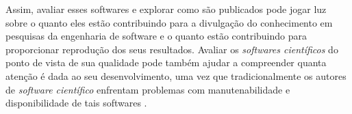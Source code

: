 %
%
%
%
%
%
%
%
%
%
%
%
%
%
%




Assim, avaliar esses softwares e explorar como são publicados pode jogar luz
sobre o quanto eles estão contribuindo para a divulgação do conhecimento em
pesquisas da engenharia de software e o quanto estão contribuindo para
proporcionar reprodução dos seus resultados. Avaliar os {\it softwares
científicos} do ponto de vista de sua qualidade pode também ajudar a
compreender quanta atenção é dada ao seu desenvolvimento, uma vez que
tradicionalmente os autores de {\it software científico} enfrentam problemas
com manutenabilidade e disponibilidade de tais softwares \cite{Prlic2012}.

